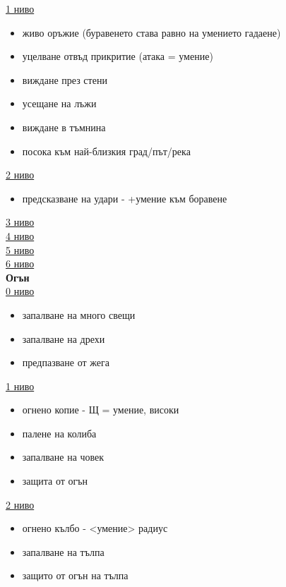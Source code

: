 \underline{1 ниво}  \\
\begin{itemize}
  \item{живо оръжие (буравенето става равно на умението гадаене)}
  \item{уцелване отвъд прикритие (атака = умение)}
  \item{виждане през стени}
  \item{усещане на лъжи}
  \item{виждане в тъмнина}
  \item{посока към най-близкия град/път/река}
\end{itemize}

\underline{2 ниво} \\
\begin{itemize}
\item{предсказване на удари - +умение към боравене}
\end{itemize}

\underline{3 ниво} \\

\underline{4 ниво} \\

\underline{5 ниво} \\

\underline{6 ниво} \\



\vspace{1cm}
\textbf{Огън}  \\
\underline{0 ниво}  \\
\begin{itemize}
  \item{запалване на много свещи}
  \item{запалване на дрехи}
  \item{предпазване от жега}
\end{itemize}

\underline{1 ниво}  \\
\begin{itemize}
  \item{огнено копие - Щ = умение, високи}
  \item{палене на колиба}
  \item{запалване на човек}
  \item{защита от огън}
\end{itemize}

\underline{2 ниво}
\begin{itemize}
  \item{огнено кълбо - <умение> радиус}
  \item{запалване на тълпа}
  \item{защито от огън на тълпа}
\end{itemize}

